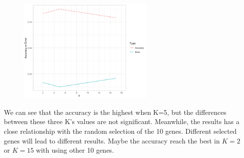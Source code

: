 \documentclass[14pt]{elegantbook}
\begin{document}
\begin{solution}
\begin{figure}[H]
    \centering
    \includegraphics[width=0.6\textwidth]{HW1_3.png}
\end{figure}

We can see that the accuracy is the highest when K=5, but the differences between these three K's values are not significant. Meanwhile, the results has a close relationship with the random selection of the 10 genes. Different selected genes will lead to different results. Maybe the accuracy reach the best in $K=2$ or $K=15$ with using other 10 genes.

\end{solution}
\end{document}
